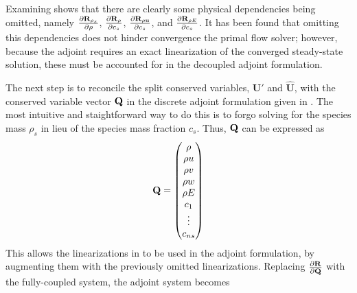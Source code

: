 Examining  shows that there are clearly some
physical dependencies being omitted, namely $\frac{\partial \mathbf R_{\rho_s}}{\partial \rho}$,
$\frac{\partial \mathbf R_{\rho}}{\partial c_s}$, $\frac{\partial \mathbf R_{\rho \mathbf u}}{\partial c_s}$, and $\frac{\partial \mathbf R_{\rho E}}{\partial c_s}$.  It has
been found\cite{candler} that omitting this dependencies does not hinder convergence
the primal flow solver; however, because the adjoint requires an exact
linearization of the converged steady-state solution, these must be accounted
for in the decoupled adjoint formulation.

The next step is to reconcile the split conserved variables, $\mathbf{U}'$ and
$\mathbf{\hat{U}}$, with the conserved variable vector $\mathbf Q$ in the discrete
adjoint formulation given in . The most intuitive and
staightforward way to do this is to forgo solving for the species mass $\rho_s$
in lieu of the species mass fraction $c_s$.  Thus, $\mathbf Q$ can be expressed as
\begin{equation}
  \mathbf Q =
  \begin{pmatrix}
  	\rho \\
  	\rho u \\
  	\rho v \\
  	\rho w \\
  	\rho E \\
    c_1 \\
    \vdots \\
    c_{ns}
  \end{pmatrix}
  \label{q-vec}
\end{equation}
This allows the linearizations in  to be used
in the adjoint formulation, by augmenting them with the previously omitted
linearizations.  Replacing $\frac{\partial \mathbf R_{}}{\partial \mathbf Q}$ with the fully-coupled system, the
adjoint system becomes
